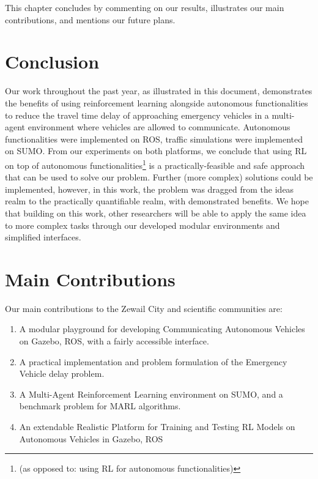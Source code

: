 This chapter concludes by commenting on our results, illustrates our main contributions, and mentions our future plans.
\label{chapter_conclusion_and_future_work}

\section{Conclusion}
\label{sec:conclusion}

Our work throughout the past year, as illustrated in this document, demonstrates the benefits of using reinforcement learning alongside autonomous functionalities to reduce the travel time delay of approaching emergency vehicles in a multi-agent environment where vehicles are allowed to communicate. Autonomous functionalities were implemented on ROS, traffic simulations were implemented on SUMO. From our experiments on both platforms, we conclude that using RL on top of autonomous functionalities\footnote{(as opposed to: using RL for autonomous functionalities)} is a practically-feasible and safe approach that can be used to solve our problem. Further (more complex) solutions could be implemented, however, in this work, the problem was dragged  from the ideas realm to the practically quantifiable realm, with demonstrated benefits. We hope that building on this work, other researchers will be able to apply the same idea to more complex tasks through our developed modular environments and simplified interfaces.

\section{Main Contributions}
\label{sec:main_contribs}
Our main contributions to the Zewail City and scientific communities are:
\begin{enumerate}
    \item A modular playground for developing Communicating Autonomous Vehicles on Gazebo, ROS, with a fairly accessible interface.
    \item A practical implementation and problem formulation of the Emergency Vehicle delay problem. 
    \item A Multi-Agent Reinforcement Learning environment on SUMO, and a benchmark problem for MARL algorithms.
    \item An extendable Realistic Platform for Training and Testing RL Models on Autonomous Vehicles in Gazebo, ROS
\end{enumerate}

